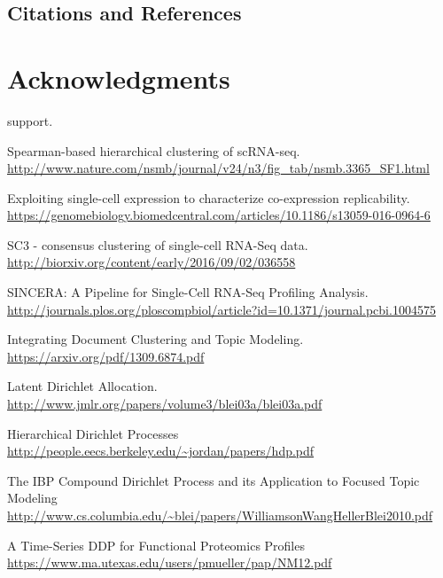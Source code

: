 \documentclass{article}
\begin{document}
\subsection{Citations and References} 

\section*{Acknowledgments} 
 
support.  


% 
% 

\begin{thebibliography}{9}
        Spearman-based hierarchical clustering of scRNA-seq.
        \url{http://www.nature.com/nsmb/journal/v24/n3/fig_tab/nsmb.3365_SF1.html}
         
        Exploiting single-cell expression to characterize co-expression replicability.
        \url{https://genomebiology.biomedcentral.com/articles/10.1186/s13059-016-0964-6}
         
        SC3 - consensus clustering of single-cell RNA-Seq data.
        \url{http://biorxiv.org/content/early/2016/09/02/036558}

        SINCERA: A Pipeline for Single-Cell RNA-Seq Profiling Analysis.
        \url{http://journals.plos.org/ploscompbiol/article?id=10.1371/journal.pcbi.1004575}

        Integrating Document Clustering and Topic Modeling.
        \url{https://arxiv.org/pdf/1309.6874.pdf}

        Latent Dirichlet Allocation.
        \url{http://www.jmlr.org/papers/volume3/blei03a/blei03a.pdf}

        Hierarchical Dirichlet Processes
        \url{http://people.eecs.berkeley.edu/~jordan/papers/hdp.pdf}

        The IBP Compound Dirichlet Process and its Application to Focused Topic Modeling
        \url{http://www.cs.columbia.edu/~blei/papers/WilliamsonWangHellerBlei2010.pdf}

        A Time-Series DDP for Functional Proteomics Profiles
        \url{https://www.ma.utexas.edu/users/pmueller/pap/NM12.pdf}


\end{thebibliography}
\end{document}
